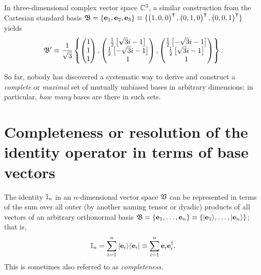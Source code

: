 {In three-dimensional complex vector space ${\Bbb C}^3$, a similar construction
from the Cartesian standard basis
${\frak B}=\{ {\bf e}_1 , {\bf e}_2, {\bf e}_3\} \equiv
\{\begin{pmatrix}1,0,0\end{pmatrix}^\intercal ,\begin{pmatrix}0,1,0\end{pmatrix}^\intercal ,\begin{pmatrix}0,0,1\end{pmatrix}^\intercal \}$
yields
\begin{equation}
\begin{split}
 {\frak B}' \equiv   \frac{1}{\sqrt{3}}  \left\{
 \begin{pmatrix}1\\1\\1\end{pmatrix},
 \begin{pmatrix}\frac{1}{2} \left[{\sqrt{3}} i-1\right] \\ \frac{1}{2} \left[-{\sqrt{3}} i-1\right] \\
  1\end{pmatrix},
\begin{pmatrix}
 \frac{1}{ 2} \left[-{\sqrt{3}} i-1\right]\\ \frac{1}{ 2} \left[{\sqrt{3}} i-1\right]\\1  \end{pmatrix}
   \right\} .
\end{split}
\end{equation}
\eexample
}

So far, nobody  has discovered a systematic way to derive and construct a {\em complete} or {\em maximal}
set of mutually unbiased bases in arbitrary dimensions; in particular,
{\em how many} bases are there in such sets.


\section{Completeness or resolution of the identity operator in terms of base vectors}
\label{2016-m-ch-fdvsrotio}

The identity ${\Bbb I}_n$ in an $n$-dimensional vector space ${\frak V}$ can be represented in terms of the sum
over all outer (by another naming tensor or dyadic) products
of all vectors of an arbitrary orthonormal basis
${\frak B} =\{
{\bf e}_1,
\ldots ,
{\bf e}_n
\}
\equiv
\{
\vert {\bf e}_1 \rangle ,
\ldots ,
\vert{\bf e}_n \rangle
\}
$; that is,
\begin{equation}
 {\Bbb I}_n = \sum_{i=1}^n \vert {\bf e}_i \rangle \langle {\bf e}_i \vert
\equiv  \sum_{i=1}^n {\bf e}_i  {\bf e}_i^\dagger  .
\label{2016-m-ch-fdlws-roi}
\end{equation}
This is sometimes also referred to as {\em completeness}.

